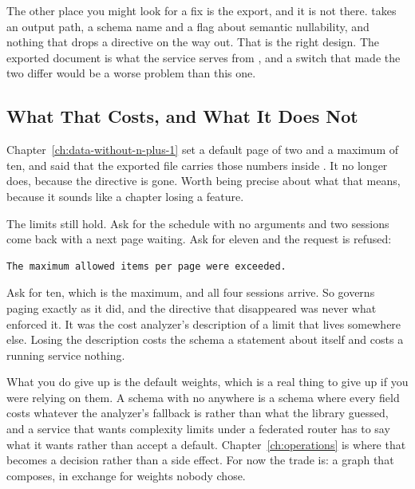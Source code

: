 %
The other place you might look for a fix is the export, and it is not there.
 takes an output path, a schema name and a flag about
semantic nullability, and nothing that drops a directive on the way out. That
is the right design. The exported document is what the service serves from
, and a switch that made the two differ would be a worse
problem than this one.

\subsection{What That Costs, and What It Does Not}

%
Chapter~\ref{ch:data-without-n-plus-1} set a default page of two and a maximum
of ten, and said that the exported file carries those numbers inside
. It no longer does, because the directive is gone. Worth being
precise about what that means, because it sounds like a chapter losing a
feature.

%
The limits still hold. Ask for the schedule with no arguments and two sessions
come back with a next page waiting. Ask for eleven and the request is refused:

\begin{verbatim}
The maximum allowed items per page were exceeded.
\end{verbatim}

%
Ask for ten, which is the maximum, and all four sessions arrive. So
\code{[UsePaging]} governs paging exactly as it did, and the directive that
disappeared was never what enforced it. It was the cost analyzer's description
of a limit that lives somewhere else. Losing the description costs the schema a
statement about itself and costs a running service nothing.

%
What you do give up is the default weights, which is a real thing to give up if
you were relying on them. A schema with no  anywhere is a schema
where every field costs whatever the analyzer's fallback is rather than what
the library guessed, and a service that wants complexity limits under a
federated router has to say what it wants rather than accept a default.
Chapter~\ref{ch:operations} is where that becomes a decision rather than a
side effect. For now the trade is: a graph that composes, in exchange for
weights nobody chose.
%
